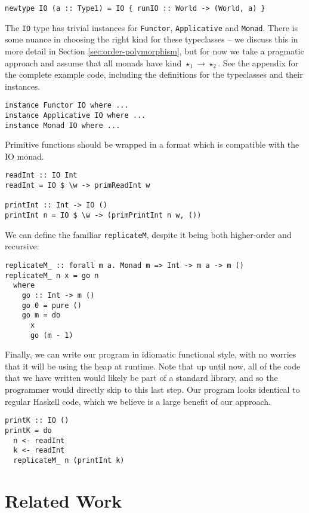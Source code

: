 \documentclass[runningheads]{llncs}
\begin{document}
\begin{verbatim}
newtype IO (a :: Type1) = IO { runIO :: World -> (World, a) }
\end{verbatim}

The \texttt{IO} type has trivial instances for \texttt{Functor}, \texttt{Applicative} and \texttt{Monad}. There is some nuance in choosing the right kind for these typeclasses -- we discuss this in more detail in Section \ref{sec:order-polymorphism}, but for now we take a pragmatic approach and assume that all monads have kind $\star_1 \rightarrow \star_2$. See the appendix for the complete example code, including the definitions for the typeclasses and their instances.

\begin{verbatim}
instance Functor IO where ...
instance Applicative IO where ...
instance Monad IO where ...
\end{verbatim}

Primitive functions should be wrapped in a format which is compatible with the IO monad.

\begin{verbatim}
readInt :: IO Int
readInt = IO $ \w -> primReadInt w

printInt :: Int -> IO ()
printInt n = IO $ \w -> (primPrintInt n w, ())
\end{verbatim}

We can define the familiar \texttt{replicateM}, despite it being both higher-order and recursive:

\begin{verbatim}
replicateM_ :: forall m a. Monad m => Int -> m a -> m ()
replicateM_ n x = go n
  where
    go :: Int -> m ()
    go 0 = pure ()
    go m = do
      x
      go (m - 1)
\end{verbatim}

Finally, we can write our program in idiomatic functional style, with no worries that it will be using the heap at runtime. Note that up until now, all of the code that we have written would likely be part of a standard library, and so the programmer would directly skip to this last step. Our program looks identical to regular Haskell code, which we believe is a large benefit of our approach.

\begin{verbatim}
printK :: IO ()
printK = do
  n <- readInt
  k <- readInt
  replicateM_ n (printInt k)
\end{verbatim}


\section{Related Work}
\end{document}
